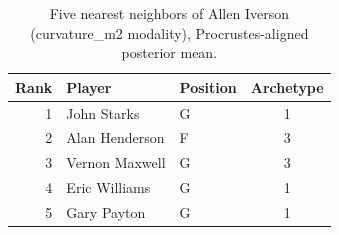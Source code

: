 \begin{table}[htbp]
  \centering\small
  \begin{tabular}{rllc}
    \toprule
    Rank & Player & Position & Archetype \\
    \midrule
    1 & John Starks & G & 1 \\
    2 & Alan Henderson & F & 3 \\
    3 & Vernon Maxwell & G & 3 \\
    4 & Eric Williams & G & 1 \\
    5 & Gary Payton & G & 1 \\
    \bottomrule
  \end{tabular}
  \caption{Five nearest neighbors of Allen Iverson (curvature_m2 modality), Procrustes-aligned posterior mean.}
  \label{tab:Allen_Iverson_neighbors_curvature_m2}
\end{table}


